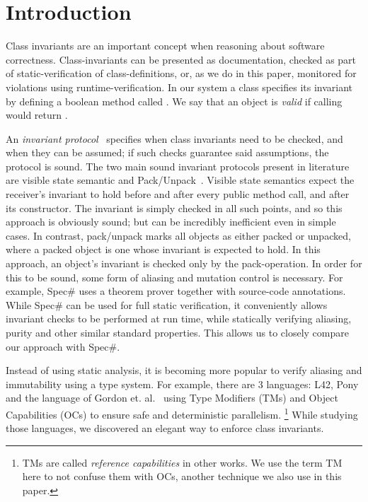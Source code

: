 \section{Introduction}

Class invariants are an important concept when reasoning about software correctness.
Class-invariants can be presented as documentation, checked as part of static-verification of class-definitions, or, as we do in this paper, monitored for violations using runtime-verification.
In our system a class specifies its invariant by defining a boolean method called \Q@invariant@. We say that an object is \emph{valid} if calling \Q@invariant@ would return \Q@true@.

An \emph{invariant protocol}~\cite{?} specifies when class invariants need to be checked, and when they can be assumed; if such checks guarantee said assumptions, the protocol is sound.
The two main sound invariant protocols present in literature are visible state semantic \cite{??} and Pack/Unpack~\cite{?}. Visible state semantics expect the receiver's invariant to hold before and after every public method call, and after its constructor. The invariant is simply checked in all such points, and so this approach is obviously sound; but can be incredibly inefficient even in simple cases.
In contrast, pack/unpack marks all objects as either packed or unpacked, where a packed object is one whose invariant is expected to hold.
In this approach, an object's invariant is checked only by the pack-operation.
In order for this to be sound, some form of aliasing and mutation control is necessary. For example, Spec\# uses a theorem prover together with source-code annotations.
While Spec\# can be used for full static verification, it conveniently allows invariant checks to be performed
at run time, while statically verifying aliasing, purity and other similar standard properties.
This allows us to closely compare our approach with Spec\#.

Instead of using static analysis, 
it is becoming more popular to verify aliasing and immutability using a type system.
For example, there are 3 languages: L42, Pony and the language of Gordon et. al.~\cite{?}
using Type Modifiers (TMs) and Object Capabilities (OCs) to ensure safe and deterministic parallelism.%
\footnote{TMs are called \emph{reference capabilities} in other works. We use the term TM here
to not confuse them with OCs, another technique we also use in this paper.}
While studying those languages, we discovered an elegant way to enforce class invariants.

